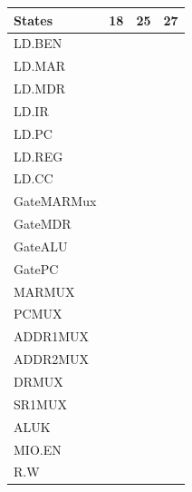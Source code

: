 \documentclass{article}
\begin{document}
\begin{enumerate}[label=(\alph*)]
\begin{enumerate}[label=(\alph*), itemsep = 120pt]
        \begin{table}[h]
            \centering
            \begin{tabular}{|>{\centering\arraybackslash}p{2.5cm}|>{\centering\arraybackslash}p{2.5cm}|>{\centering\arraybackslash}p{2.5cm}|>{\centering\arraybackslash}p{2.5cm}|}
            \hline
            \textbf{States} & \textbf{18} & \textbf{25} & \textbf{27} \\
            \hline
            LD.BEN & & & \\
            \hline
            LD.MAR & & & \\
            \hline
            LD.MDR & & & \\
            \hline
            LD.IR & & & \\
            \hline
            LD.PC & & & \\
            \hline
            LD.REG & & & \\
            \hline
            LD.CC & & & \\
            \hline
            GateMARMux & & & \\
            \hline
            GateMDR & & & \\
            \hline
            GateALU & & & \\
            \hline
            GatePC & & & \\
            \hline
            MARMUX & & & \\
            \hline
            PCMUX & & & \\
            \hline
            ADDR1MUX & & & \\
            \hline
            ADDR2MUX & & & \\
            \hline
            DRMUX & & & \\
            \hline
            SR1MUX & & & \\
            \hline
            ALUK & & & \\
            \hline
            MIO.EN & & & \\
            \hline
            R.W & & & \\
            \hline
            \end{tabular}
            \label{tab:modified}

        \end{table}
    \end{enumerate}
     \newpage


\end{enumerate}
\end{document}
